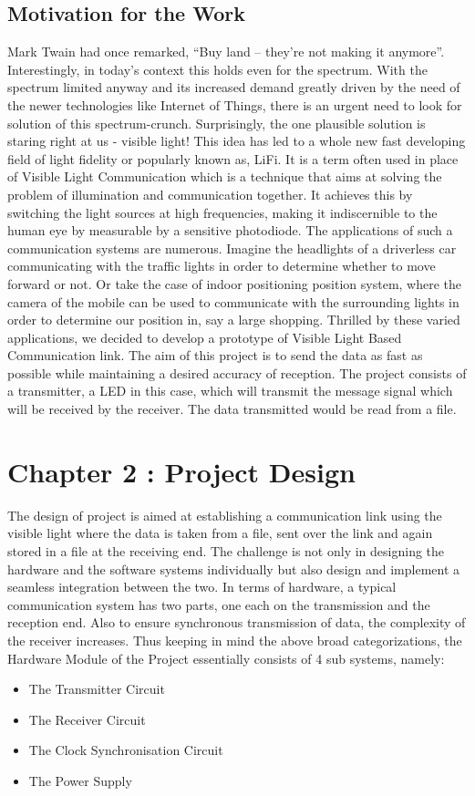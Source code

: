 \documentclass{article}
\begin{document}
\subsection{Motivation for the Work}
Mark Twain had once remarked, “Buy land -- they’re not making it anymore”. Interestingly, in today’s context this holds even for the spectrum. With the spectrum limited anyway and its increased demand greatly driven by the need of the newer technologies like Internet of Things, there is an urgent need to look for solution of this spectrum-crunch. 
Surprisingly, the one plausible solution is staring right at us - visible light! This idea has led to a whole new fast developing field of light fidelity or popularly known as, LiFi. It is a term often used in place of Visible Light Communication which is a technique that aims at solving the problem of illumination and communication together. It achieves this by switching the light sources at high frequencies, making it indiscernible to the human eye by measurable by a sensitive photodiode. The applications of such a communication systems are numerous. Imagine the headlights of a driverless car communicating with the traffic lights in order to determine whether to move forward or not. Or take the case of indoor positioning position system, where the camera of the mobile can be used to communicate with the surrounding lights in order to determine our position in, say a large shopping.    
Thrilled by these varied applications, we decided to develop a prototype of Visible Light Based Communication link. The aim of this project is to send the data as fast as possible while maintaining a desired accuracy of reception. The project consists of a transmitter, a LED in this case, which will transmit the message signal which will be received by the receiver. The data transmitted would be read from a file.

\section{Chapter 2 : Project Design}
The design of project is aimed at establishing a communication link using the visible light where the data is taken from a file, sent over the link and again stored in a file at the receiving end. The challenge is not only in designing the hardware and the software systems individually but also design and implement a seamless integration between the two. In terms of hardware, a typical communication system has two parts, one each on the transmission and the reception end. Also to ensure synchronous transmission of data, the complexity of the receiver increases. Thus keeping in mind the above broad categorizations, the Hardware Module of the Project essentially consists of 4 sub systems, namely:
\begin{itemize}
\item The Transmitter Circuit
\item The Receiver Circuit
\item The Clock Synchronisation Circuit
\item The Power Supply
\end{itemize}
\end{document}
